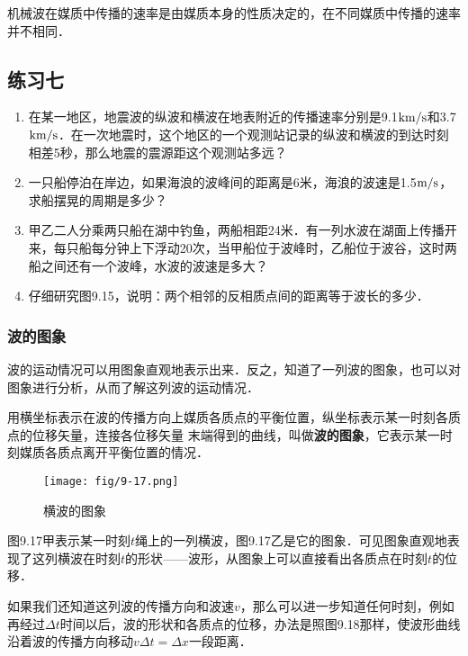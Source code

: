 机械波在媒质中传播的速率是由媒质本身的性质决定的，在不同媒质中传播的速率并不相同．

\subsection*{练习七}
\begin{enumerate}
    \item 在某一地区，地震波的纵波和横波在地表附近的传播速率分别是9.1${\rm km}/{\rm s}$和3.7${\rm km}/{\rm s}$．在一次地震时，这个地区的一个观测站记录的纵波和横波的到达时刻相差5秒，那么地震的震源距这个观测站多远？
    \item 一只船停泊在岸边，如果海浪的波峰间的距离是6米，海浪的波速是1.5$\text{m}/\text{s}$，求船摆晃的周期是多少？
    \item 甲乙二人分乘两只船在湖中钓鱼，两船相距24米．有一列水波在湖面上传播开来，每只船每分钟上下浮动20次，当甲船位于波峰时，乙船位于波谷，这时两船之间还有一个波峰，水波的波速是多大？
    \item 仔细研究图9.15，说明：两个相邻的反相质点间的距离等于波长的多少．
\end{enumerate}

\subsubsection{波的图象}

波的运动情况可以用图象直观地表示出来．反之，知道了一列波的图象，也可以对图象进行分析，从而了解这列波的运动情况．

用横坐标表示在波的传播方向上媒质各质点的平衡位置，纵坐标表示某一时刻各质点的位移矢量，连接各位移矢量
末端得到的曲线，叫做\textbf{波的图象}，它表示某一时刻媒质各质点离开平衡位置的情况．
\begin{figure}[htp]\centering
    \texttt{[image: fig/9-17.png]}
    \caption{横波的图象}
    \end{figure}

图9.17甲表示某一时刻$t$绳上的一列横波，图9.17乙是它的图象．可见图象直观地表现了这列横波在时刻$t$的形状——波形，从图象上可以直接看出各质点在时刻$t$的位移．

如果我们还知道这列波的传播方向和波速$v$，那么可以进一步知道任何时刻，例如再经过$\Delta t$时间以后，波的形状和各质点的位移，办法是照图9.18那样，使波形曲线沿着波的传播方向移动$v\Delta t=\Delta x$一段距离．

